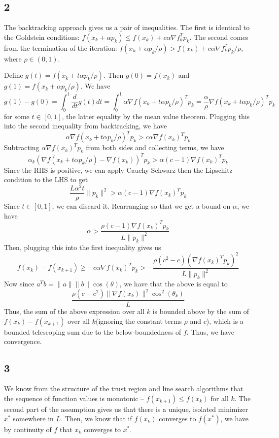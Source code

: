 \documentclass{article}
\begin{document}
\subsection*{2}
The backtracking approach gives us a pair of inequalities. The first is identical to the Goldstein conditions:  $f(x_k+\alpha p_k)\leq f(x_k)+c\alpha\nabla f_k^Tp_k$. The second comes from the termination of the iteration: $f(x_k+\alpha p_k/\rho)>f(x_k)+c\alpha\nabla f_k^Tp_k/\rho$, where $\rho\in(0,1)$. 

Define $g(t)=f(x_k+t\alpha p_k/\rho)$. Then $g(0)=f(x_k)$ and $g(1)=f(x_k+\alpha p_k/\rho)$. We have 
\[g(1)-g(0)=\int_0^1\frac{d}{dt}g(t)dt=\int_0^1\alpha\nabla f(x_k+t\alpha p_k/\rho)^Tp_k=\frac{\alpha}{\rho}\nabla f(x_k+t\alpha p_k/\rho)^Tp_k\]
for some $t\in[0,1]$, the latter equality by the mean value theorem. Plugging this into the second inequality from backtracking, we have
\[\alpha\nabla f(x_k+t\alpha p_k/\rho)^Tp_k>c\alpha\nabla f(x_k)^Tp_k\]
Subtracting $\alpha\nabla f(x_k)^Tp_k$ from both sides and collecting terms, we have
\[\alpha_k\left(\nabla f(x_k+t\alpha p_k/\rho)-\nabla f(x_k)\right)^Tp_k>\alpha(c-1)\nabla f(x_k)^Tp_k\]
Since the RHS is positive, we can apply Cauchy-Schwarz then the Lipschitz condition to the LHS to get
\[\frac{L\alpha^2t}{\rho}\|p_k\|^2>\alpha(c-1)\nabla f(x_k)^Tp_k\]
Since $t\in[0,1]$, we can discard it. Rearranging so that we get a bound on $\alpha$, we have 
\[\alpha>\frac{\rho(c-1)\nabla f(x_k)^Tp_k}{L\|p_k\|^2}\]
Then, plugging this into the first inequality gives us
\[f(x_k)-f(x_{k+1})\geq-c\alpha\nabla f(x_k)^Tp_k>-\frac{\rho(c^2-c)\left(\nabla f(x_k)^Tp_k\right)^2}{L\|p_k\|^2}\]
Now since $a^Tb=\|a\|\|b\|\cos(\theta)$, we have that the above is equal to 
\[\frac{\rho(c-c^2)\|\nabla f(x_k)\|^2\cos^2(\theta_k)}{L}\]
Thus, the sum of the above expression over all $k$ is bounded above by the sum of $f(x_k)-f(x_{k+1})$ over all $k$(ignoring the constant terms $\rho$ and $c$), which is a bounded telescoping sum due to the below-boundedness of $f$. Thus, we have convergence.
\subsection*{3}
We know from the structure of the trust region and line search algorithms that the sequence of function values is monotonic -- $f(x_{k+1})\leq f(x_k)$ for all $k$. The second part of the assumption gives us that there is a unique, isolated minimizer $x^*$ somewhere in $L$. Then, we know that if $f(x_k)$ converges to $f(x^*)$, we have by continuity of $f$ that $x_k$ converges to $x^*$.
\end{document}
